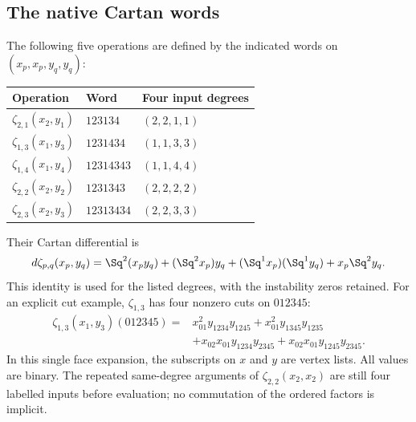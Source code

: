 \subsection{The native Cartan words}
The following five operations are defined by the indicated words on $(x_p,x_p,y_q,y_q)$:
\begin{center}
\begin{tabular}{lll}\toprule
Operation & Word & Four input degrees\\\midrule
$\zeta_{2,1}(x_2,y_1)$ & $123134$ & $(2,2,1,1)$\\
$\zeta_{1,3}(x_1,y_3)$ & $1231434$ & $(1,1,3,3)$\\
$\zeta_{1,4}(x_1,y_4)$ & $12314343$ & $(1,1,4,4)$\\
$\zeta_{2,2}(x_2,y_2)$ & $1231343$ & $(2,2,2,2)$\\
$\zeta_{2,3}(x_2,y_3)$ & $12313434$ & $(2,2,3,3)$\\\bottomrule
\end{tabular}
\end{center}
Their Cartan differential is
\begin{equation}\label{eq:native-Cartan}
 d\zeta_{p,q}(x_p,y_q)
 =\Sq^2(x_py_q)+(\Sq^2x_p)y_q
  +(\Sq^1x_p)(\Sq^1y_q)+x_p\Sq^2y_q.
\end{equation}
This identity is used for the listed degrees, with the instability zeros retained. For an explicit cut example, $\zeta_{1,3}$ has four nonzero cuts on $012345$:
\begin{align}\label{eq:four-Cartan-cuts}
\zeta_{1,3}(x_1,y_3)(012345)={}&x_{01}^2y_{1234}y_{1245}
+x_{01}^2y_{1345}y_{1235}\nonumber\\
&+x_{02}x_{01}y_{1234}y_{2345}
+x_{02}x_{01}y_{1245}y_{2345}.
\end{align}
In this single face expansion, the subscripts on $x$ and $y$ are vertex lists. All values are binary. The repeated same-degree arguments of $\zeta_{2,2}(x_2,x_2)$ are still four labelled inputs before evaluation; no commutation of the ordered factors is implicit.


